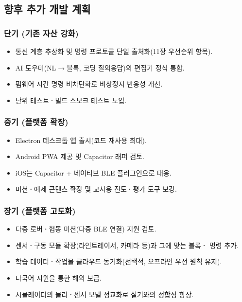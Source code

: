 \subsection{향후 추가 개발 계획}

\subsubsection{단기 (기존 자산 강화)}

\begin{itemize}
  \item 통신 계층 추상화 및 명령 프로토콜 단일 출처화(11장 우선순위 항목).
  \item AI 도우미(NL$\to$블록, 코딩 질의응답)의 편집기 정식 통합.
  \item 펌웨어 시간 명령 비차단화로 비상정지 반응성 개선.
  \item 단위 테스트\textbf{·}빌드 스모크 테스트 도입.
\end{itemize}

\subsubsection{중기 (플랫폼 확장)}

\begin{itemize}
  \item Electron 데스크톱 앱 출시(코드 재사용 최대).
  \item Android PWA 제공 및 Capacitor 래퍼 검토.
  \item iOS는 Capacitor + 네이티브 BLE 플러그인으로 대응.
  \item 미션\textbf{·}예제 콘텐츠 확장 및 교사용 진도\textbf{·}평가 도구 보강.
\end{itemize}

\subsubsection{장기 (플랫폼 고도화)}

\begin{itemize}
  \item 다중 로버\textbf{·}협동 미션(다중 BLE 연결) 지원 검토.
  \item 센서\textbf{·}구동 모듈 확장(라인트레이서, 카메라 등)과 그에 맞는 블록\textbf{·}
        명령 추가.
  \item 학습 데이터\textbf{·}작업물 클라우드 동기화(선택적, 오프라인 우선 원칙
        유지).
  \item 다국어 지원을 통한 해외 보급.
  \item 시뮬레이터의 물리\textbf{·}센서 모델 정교화로 실기와의 정합성 향상.
\end{itemize}

